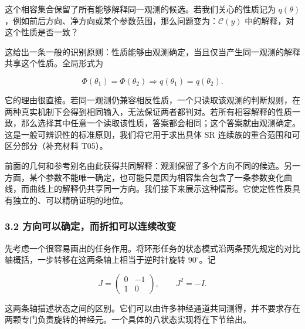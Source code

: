 \documentclass[11pt,a4paper]{article}
\begin{document}
这个相容集合保留了所有能够解释同一观测的候选。若我们关心的性质记为
\(q(\theta)\)，例如前后方向、净方向或某个参数范围，那么问题变为：\(\mathcal C(y)\)
中的解释，对这个性质是否一致？

\par
\noindent\begin{minipage}{\linewidth}

这给出一条一般的识别原则：性质能够由观测确定，当且仅当产生同一观测的解释共享这个性质。全局形式为

\[
\Phi(\theta_1)=\Phi(\theta_2)
\Longrightarrow
q(\theta_1)=q(\theta_2).
\]

\end{minipage}\par

它的理由很直接。若同一观测仍兼容相反性质，一个只读取该观测的判断规则，在两种真实机制下会得到相同输入，无法保证两者都判对。若所有相容解释的性质一致，那么选择其中任意一个读取该性质，答案都会相同；这个答案就由观测确定。这是一般可辨识性的标准原则，我们将它用于求出具体
SR 连续族的重合范围和可区分部分（补充材料 T05）。

前面的几何和参考别名由此获得共同解释：观测保留了多个方向不同的候选。另一方面，某个参数不能唯一确定，也可能只是因为相容集合包含了一条参数变化曲线，而曲线上的解释仍共享同一方向。我们接下来展示这种情形。它使定性性质具有独立的、可以精确证明的地位。

\subsubsection{3.2
方向可以确定，而折扣可以连续改变}\label{ux65b9ux5411ux53efux4ee5ux786eux5b9aux800cux6298ux6263ux53efux4ee5ux8fdeux7eedux6539ux53d8}

\par
\noindent\begin{minipage}{\linewidth}

先考虑一个很容易画出的任务作用。将环形任务的状态模式沿两条预先规定的对比轴概括，一步转移在这两条轴上相当于逆时针旋转
\(90^\circ\)。记

\[
J=\begin{pmatrix}0&-1\\1&0\end{pmatrix},\qquad J^2=-I.
\]

\end{minipage}\par

这两条轴描述状态之间的区别。它们可以由许多神经通道共同测得，并不要求存在两颗专门负责旋转的神经元。一个具体的八状态实现将在下节给出。
\end{document}
